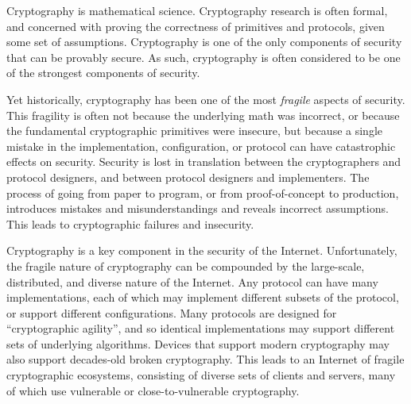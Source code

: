 
Cryptography is mathematical science. Cryptography research is often formal,
and concerned with proving the correctness of primitives and
protocols, given some set of assumptions. Cryptography is one of the only
components of security that can be provably secure. As such, cryptography is
often considered to be one of the strongest components of security.

Yet historically, cryptography has been one of the most \textit{fragile}
aspects of security. This fragility is often not because the underlying math
was incorrect, or because the fundamental cryptographic primitives were
insecure, but because a single mistake in the implementation, configuration,
or protocol can have catastrophic effects on security. Security is lost in
translation between the cryptographers and protocol designers, and between
protocol designers and implementers. The process of going from paper to
program, or from proof-of-concept to production, introduces mistakes and
misunderstandings and reveals incorrect assumptions. This leads to
cryptographic failures and insecurity.


Cryptography is a key component in the security of the Internet.
Unfortunately, the fragile nature of cryptography can be compounded by the
large-scale, distributed, and diverse nature of the Internet. Any protocol
can have many implementations, each of which may implement different subsets
of the protocol, or support different configurations. Many protocols are
designed for ``cryptographic agility'', and so identical implementations may
support different sets of underlying algorithms. Devices that support modern
cryptography may also support decades-old broken cryptography. This leads to
an Internet of fragile cryptographic ecosystems, consisting of diverse sets
of clients and servers, many of which use vulnerable or close-to-vulnerable
cryptography.


